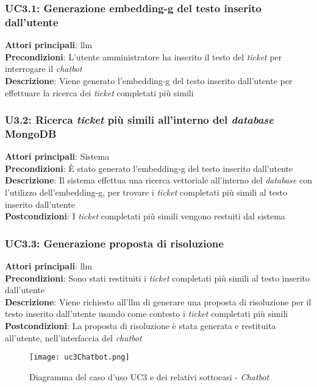 \subsubsection{UC3.1: Generazione \gls{embedding-g} del testo inserito dall'utente}
\textbf{Attori principali}: \gls{llm} \\
\textbf{Precondizioni}: L'utente amministratore ha inserito il testo del \textit{ticket} per interrogare il \textit{chatbot} \\
\textbf{Descrizione}: Viene generato l'\gls{embedding-g} del testo inserito dall'utente per effettuare la ricerca dei \textit{ticket} completati più simili \\

\subsubsection{U3.2: Ricerca \textit{ticket} più simili all'interno del \textit{database} MongoDB}
\textbf{Attori principali}: Sistema \\
\textbf{Precondizioni}: È stato generato l'\gls{embedding-g} del testo inserito dall'utente \\
\textbf{Descrizione}: Il sistema effettua una ricerca vettoriale all'interno del \textit{database} con l'utilizzo dell'\gls{embedding-g}, per trovare i \textit{ticket} completati più simili al testo inserito dall'utente \\
\textbf{Postcondizioni}: I \textit{ticket} completati più simili vengono restuiti dal sistema \\

\subsubsection{UC3.3: Generazione proposta di risoluzione}
\textbf{Attori principali}: \gls{llm} \\
\textbf{Precondizioni}: Sono stati restituiti i \textit{ticket} completati più simili al testo inserito dall'utente \\
\textbf{Descrizione}: Viene richiesto all'\gls{llm} di generare una proposta di risoluzione per il testo inserito dall'utente usando come contesto i \textit{ticket} completati più simili \\
\textbf{Postcondizioni}: La proposta di risoluzione è stata generata e restituita all'utente, nell'interfaccia del \textit{chatbot} \\


\begin{figure}[H]
    \centering
    \texttt{[image: uc3Chatbot.png]}
    \caption{Diagramma del caso d'uso UC3 e dei relativi sottocasi - \textit{Chatbot}}
    \label{fig:UC3Chatbot}
\end{figure}

